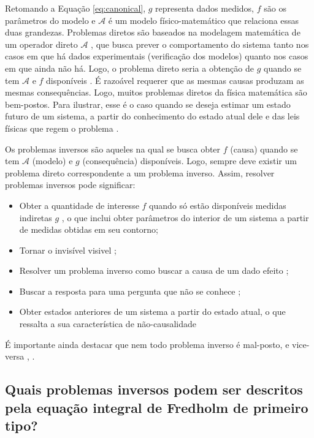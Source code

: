 Retomando a Equação \eqref{eq:canonical}, $g$ representa dados medidos, $f$ são os parâmetros do modelo e $\mathcal{A}$ é um modelo físico-matemático que relaciona essas duas grandezas. Problemas diretos são baseados na modelagem matemática de um operador direto $\mathcal{A}$ \cite[Seção 1]{Arridge2019}, que busca prever o comportamento do sistema tanto nos casos em que há dados experimentais (verificação dos modelos) quanto nos casos em que ainda não há. Logo, o problema direto seria a obtenção de $g$ quando se tem $\mathcal{A}$ e $f$ disponíveis \cite[pág. 5]{Hansen1998}. É razoável requerer que as mesmas causas produzam as mesmas consequências. Logo, muitos problemas diretos da física matemática são bem-postos. Para ilustrar, esse é o caso quando se deseja estimar um estado futuro de um sistema, a partir do conhecimento do estado atual dele e das leis físicas que regem o problema \cite[pág. 3]{engl1996regularization}. 

Os problemas inversos são aqueles na qual se busca obter $f$ (causa) quando se tem $\mathcal{A}$ (modelo) e $g$ (consequência) disponíveis. Logo, sempre deve existir um problema direto correspondente a um problema inverso. Assim, resolver problemas inversos pode significar:
\begin{itemize}
\item Obter a quantidade de interesse $f$ quando só estão disponíveis medidas indiretas $g$  \cite[pág. 1]{kaipio2005statistical}, o que inclui obter parâmetros do interior de um sistema a partir de medidas obtidas em seu contorno;
\item Tornar  o invisível visivel \cite{Uhlmann2014};
\item Resolver um problema inverso como buscar a causa de um dado efeito \cite{baumeister2005topics};
\item Buscar a resposta para uma pergunta que não se conhece \cite{Keller1976};
\item Obter estados anteriores de um sistema a partir do estado atual, o que ressalta a sua característica de não-causalidade \cite[págs. 1-2]{kaipio2005statistical}

\end{itemize}
É importante ainda destacar que nem todo problema inverso é mal-posto, e vice-versa \cite[pág. 4]{Mueller2012}, \cite[Subseção 1.3]{tikhonov1977solutions}.

\subsection{Quais problemas inversos podem ser descritos pela equação integral de Fredholm de primeiro tipo?}\label{sec:fredh}

